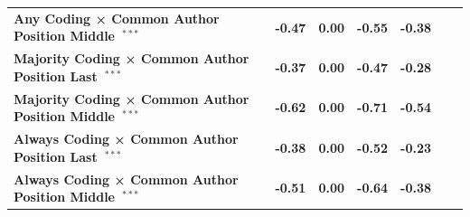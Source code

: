 \documentclass[
  letterpaper,
  DIV=11,
  numbers=noendperiod]{scrartcl}
\begin{document}
\begin{table}
{{\begin{tabular}{l*{6}{r}}
    \bfseries\cellcolor{white}Any Coding × Common Author Position Middle~$^{***}$ & \bfseries\cellcolor{white}-0.47 & \bfseries\cellcolor{white}0.00 & \bfseries\cellcolor{white}-0.55 & \bfseries\cellcolor{white}-0.38 \\
    \bfseries\cellcolor{gray!10}Majority Coding × Common Author Position Last~$^{***}$ & \bfseries\cellcolor{gray!10}-0.37 & \bfseries\cellcolor{gray!10}0.00 & \bfseries\cellcolor{gray!10}-0.47 & \bfseries\cellcolor{gray!10}-0.28 \\
    \bfseries\cellcolor{white}Majority Coding × Common Author Position Middle~$^{***}$ & \bfseries\cellcolor{white}-0.62 & \bfseries\cellcolor{white}0.00 & \bfseries\cellcolor{white}-0.71 & \bfseries\cellcolor{white}-0.54 \\
    \bfseries\cellcolor{gray!10}Always Coding × Common Author Position Last~$^{***}$ & \bfseries\cellcolor{gray!10}-0.38 & \bfseries\cellcolor{gray!10}0.00 & \bfseries\cellcolor{gray!10}-0.52 & \bfseries\cellcolor{gray!10}-0.23 \\
    \bfseries\cellcolor{white}Always Coding × Common Author Position Middle~$^{***}$ & \bfseries\cellcolor{white}-0.51 & \bfseries\cellcolor{white}0.00 & \bfseries\cellcolor{white}-0.64 & \bfseries\cellcolor{white}-0.38 \\
\bottomrule
\end{tabular}
}

}

\end{table}%
\end{document}
